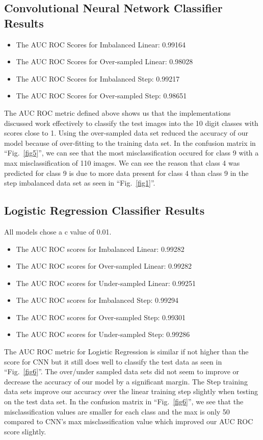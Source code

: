 \documentclass[Dealing with Imbalance in Computer Vision]{IEEEtran}
\begin{document}
\subsection{Convolutional Neural Network Classifier Results}
\begin{itemize}
  \item The AUC ROC Scores for Imbalanced Linear: 0.99164
  \item The AUC ROC Scores for Over-sampled Linear: 0.98028
  \item The AUC ROC Scores for Imbalanced Step: 0.99217
  \item The AUC ROC Scores for Over-sampled Step: 0.98651
\end{itemize}

The AUC ROC metric defined above shows us that the implementations discussed work effectively to classify the test images into the 10 digit classes with scores close to 1. Using the over-sampled data set reduced the accuracy of our model because of over-fitting to the training data set. In the confusion matrix in ``Fig.~\ref{fig5}'', we can see that the most misclassification occured for class 9 with a max misclassification of 110 images. We can see the reason that class 4 was predicted for class 9 is due to more data present for class 4 than class 9 in the step imbalanced data set as seen in ``Fig.~\ref{fig1}''.

\subsection{Logistic Regression Classifier Results}
All models chose a c value of 0.01.
\begin{itemize}
    \item The AUC ROC scores for Imbalanced Linear: 0.99282
    \item The AUC ROC scores for Over-sampled Linear: 0.99282
    \item The AUC ROC scores for Under-sampled Linear: 0.99251
    \item The AUC ROC scores for Imbalanced Step: 0.99294
    \item The AUC ROC scores for Over-sampled Step: 0.99301
    \item The AUC ROC scores for Under-sampled Step: 0.99286
\end{itemize}

The AUC ROC metric for Logistic Regression is similar if not higher than the score for CNN but it still does well to classify the test data as seen in ``Fig.~\ref{fig6}''. The over/under sampled data sets did not seem to improve or decrease the accuracy of our model by a significant margin. The Step training data sets improve our accuracy over the linear training step slightly when testing on the test data set. In the confusion matrix in ``Fig.~\ref{fig6}'', we see that the misclassification values are smaller for each class and the max is only 50 compared to CNN's max misclassification value which improved our AUC ROC score slightly.
\end{document}
